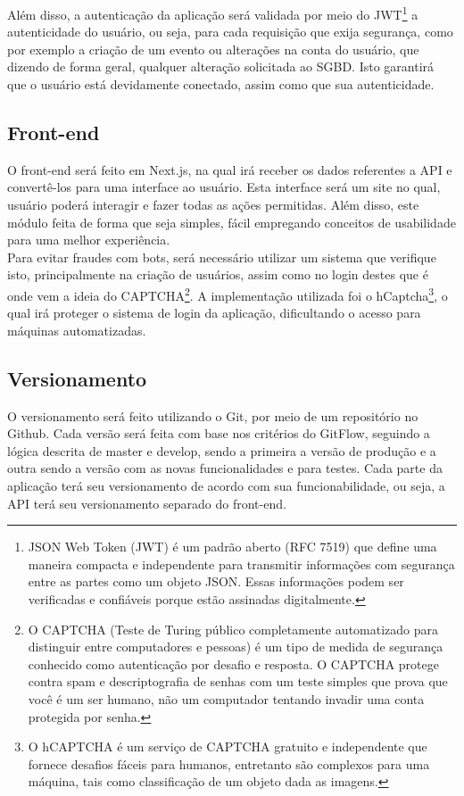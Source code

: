 Além disso, a autenticação da aplicação será validada por meio do JWT\footnote{JSON Web Token (JWT) é um padrão aberto (RFC 7519) que define uma maneira compacta e independente para transmitir informações com segurança entre as partes como um objeto JSON. Essas informações podem ser verificadas e confiáveis porque estão assinadas digitalmente.} a autenticidade do usuário, ou seja, para cada requisição que exija segurança, como por exemplo a criação de um evento ou alterações na conta do usuário, que dizendo de forma geral, qualquer alteração solicitada ao SGBD. Isto garantirá que o usuário está devidamente conectado, assim como que sua autenticidade.

\subsection{Front-end}
O front-end será feito em Next.js, na qual irá receber os dados referentes a API e convertê-los para uma interface ao usuário. Esta interface será um site no qual, usuário poderá interagir e fazer todas as ações permitidas. Além disso, este módulo feita de forma que seja simples, fácil empregando conceitos de usabilidade para uma melhor experiência.\\
Para evitar fraudes com bots, será necessário utilizar um sistema que verifique isto, principalmente na criação de usuários, assim como no login destes que é onde vem a ideia do CAPTCHA\footnote{O CAPTCHA (Teste de Turing público completamente automatizado para distinguir entre computadores e pessoas) é um tipo de medida de segurança conhecido como autenticação por desafio e resposta. O CAPTCHA protege contra spam e descriptografia de senhas com um teste simples que prova que você é um ser humano, não um computador tentando invadir uma conta protegida por senha.}. A implementação utilizada foi o hCaptcha\footnote{O hCAPTCHA é um serviço de CAPTCHA gratuito e independente que fornece desafios fáceis para humanos, entretanto são complexos para uma máquina, tais como classificação de um objeto dada as imagens.}, o qual irá proteger o sistema de login da aplicação, dificultando o acesso para máquinas automatizadas.

\subsection{Versionamento}
O versionamento será feito utilizando o Git, por meio de um repositório no Github. Cada versão será feita com base nos critérios do GitFlow, seguindo a lógica descrita de master e develop, sendo a primeira a versão de produção e a outra sendo a versão com as novas funcionalidades e para testes. Cada parte da aplicação terá seu versionamento de acordo com sua funcionabilidade, ou seja, a API terá seu versionamento separado do front-end.

